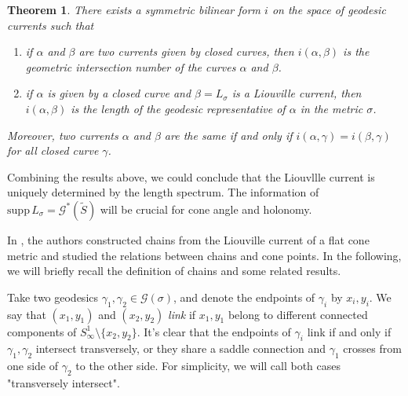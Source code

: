 \documentclass[reqno]{amsart}
\theoremstyle{plain}
\newtheorem{thm}{Theorem}[section]
\theoremstyle{definition}
\theoremstyle{remark}
\theoremstyle{definition}
\newcommand{\?}{\textcolor{red}{?}}
\newcommand{\Gsigma}{\mathcal{G}(\sigma) }
\newcommand{\Gss}{\mathcal{G}^*(\tilde{S}) }
\newcommand{\supp}{\mathrm{supp}\, L_\sigma}
\begin{document}
\begin{thm}

There exists a symmetric bilinear form $i$ on the space of geodesic currents such that
\begin{enumerate}
    \item[(1)] if $\alpha$ and $\beta$ are two currents given by closed curves, then $i(\alpha,\beta)$ is the geometric intersection number of the curves $\alpha$ and $\beta$.
    \item[(2)] if $\alpha$ is given by a closed curve and $\beta = L_\sigma$ is a Liouville current, then $i(\alpha,\beta)$ is the length of the geodesic representative of $\alpha$ in the metric $\sigma$.
\end{enumerate}
Moreover, two currents $\alpha$ and $\beta$ are the same if and only if $i(\alpha, \gamma) = i(\beta,\gamma)$ for all closed curve $\gamma$.
\end{thm}

Combining the results above, we could conclude that the Liouvllle current is uniquely determined by the length spectrum. The information of $\supp=\Gss$ will be crucial for cone angle and holonomy.
\fi


In \cite{bankovic2018marked}, the authors constructed chains from the Liouville current of a flat cone metric and studied the relations between chains and cone points. In the following, we will briefly recall the definition of chains and some related results.

Take two geodesics $\gamma_1,\gamma_2\in \Gsigma$, and denote the endpoints of $\gamma_i$ by $x_i, y_i$. We say that $(x_1, y_1)$ and $(x_2,y_2)$ \textit{link} if $x_1,y_1$ belong to different connected components of $S^1_\infty\setminus\{x_2,y_2\}$. It's clear that the endpoints of $\gamma_i$ link if and only if $\gamma_1,\gamma_2$ intersect transversely, or they share a saddle connection and $\gamma_1$ crosses from one side of $\gamma_2$ to the other side. For simplicity, we will call both cases "transversely intersect".
\end{document}
